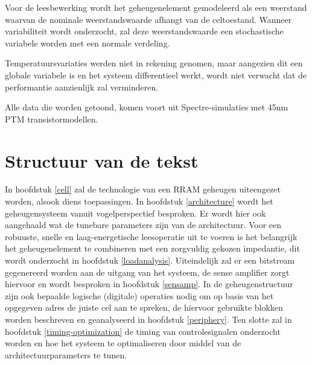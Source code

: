 Voor de leesbewerking wordt het geheugenelement gemodeleerd als een weerstand waarvan de nominale weerstandswaarde afhangt van de celtoestand. Wanneer variabiliteit wordt onderzocht, zal deze weerstandswaarde een stochastische variabele worden met een normale verdeling.

Temperatuursvariaties werden niet in rekening genomen, maar aangezien dit een globale variabele is en het systeem differentieel werkt, wordt niet verwacht dat de performantie aanzienlijk zal verminderen.

Alle data die worden getoond, komen voort uit Spectre-simulaties met 45nm PTM transistormodellen.

\section{Structuur van de tekst}
In hoofdstuk \ref{cell} zal de technologie van een RRAM geheugen uiteengezet worden, alsook diens toepassingen. In hoofdstuk \ref{architecture} wordt het geheugensysteem vanuit vogelperspectief besproken. Er wordt hier ook aangehaald wat de tunebare parameters zijn van de architectuur. Voor een robuuste, snelle en laag-energetische leesoperatie uit te voeren is het belangrijk het geheugenelement te combineren met een zorgvuldig gekozen impedantie, dit wordt onderzocht in hoofdstuk \ref{loadanalysis}. Uiteindelijk zal er een bitstream gegenereerd worden aan de uitgang van het systeem, de sense amplifier zorgt hiervoor en wordt besproken in hoofdstuk \ref{sensamp}.
In de geheugenstructuur zijn ook bepaalde logische (digitale) operaties nodig om op basis van het opgegeven adres de juiste cel aan te spreken, de hiervoor gebruikte blokken worden beschreven en geanalyseerd in hoofdstuk \ref{periphery}.
Ten slotte zal in hoofdstuk \ref{timing-optimization} de timing van controlesignalen onderzocht worden en hoe het systeem te optimaliseren door middel van de architectuurparameters te tunen.
